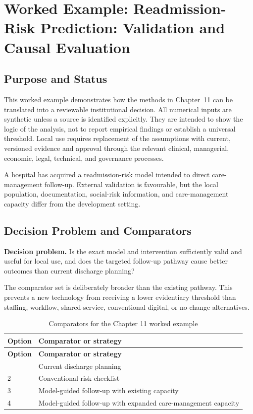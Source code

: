 \section{Worked Example: Readmission-Risk Prediction: Validation and Causal Evaluation}
\label{sec:comp-ch11-worked-example}

\subsection{Purpose and Status}
This worked example demonstrates how the methods in Chapter~11 can be
translated into a reviewable institutional decision. All numerical inputs are
synthetic unless a source is identified explicitly. They are intended to show the
logic of the analysis, not to report empirical findings or establish a universal
threshold. Local use requires replacement of the assumptions with current,
versioned evidence and approval through the relevant clinical, managerial,
economic, legal, technical, and governance processes.

A hospital has acquired a readmission-risk model intended to direct care-management follow-up. External validation is favourable, but the local population, documentation, social-risk information, and care-management capacity differ from the development setting. 

\subsection{Decision Problem and Comparators}
\textbf{Decision problem.} Is the exact model and intervention sufficiently valid and useful for local use, and does the targeted follow-up pathway cause better outcomes than current discharge planning?

The comparator set is deliberately broader than the existing pathway. This prevents
a new technology from receiving a lower evidentiary threshold than staffing,
workflow, shared-service, conventional digital, or no-change alternatives.

\begin{longtable}{@{}p{}p{}@{}}
\caption{Comparators for the Chapter 11 worked example}
\label{tab:comp-ch11-comparators}\\
\toprule
\textbf{Option} & \textbf{Comparator or strategy} \\
\midrule
\endfirsthead
\toprule
\textbf{Option} & \textbf{Comparator or strategy} \\
\midrule
\endhead
\bottomrule
\endlastfoot
1 & Current discharge planning \\
2 & Conventional risk checklist \\
3 & Model-guided follow-up with existing capacity \\
4 & Model-guided follow-up with expanded care-management capacity \\
\end{longtable}

